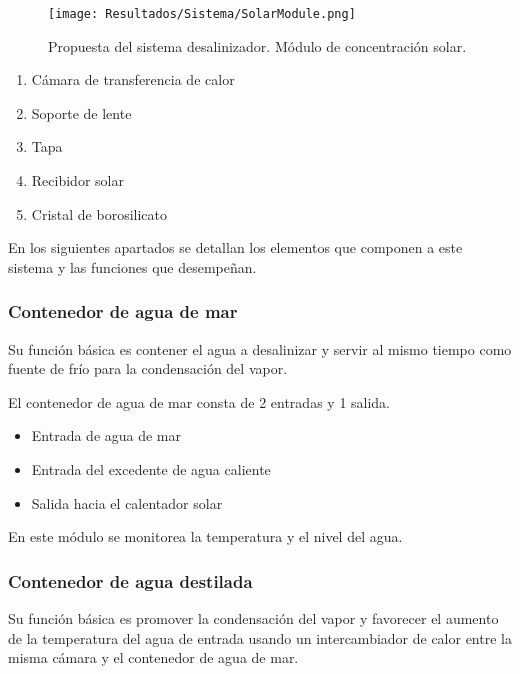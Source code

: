 			\begin{figure}[H]
				\centering
				\texttt{[image: Resultados/Sistema/SolarModule.png]}
				\caption{Propuesta del sistema desalinizador. Módulo de concentración solar.}
				\label{fig:SolarModule}
			\end{figure}
			
			\begin{enumerate}[columns=2]
				\item Cámara de transferencia de calor
				\item Soporte de lente
				\item Tapa
				\item Recibidor solar
				\item Cristal de borosilicato
			\end{enumerate}
			
			En los siguientes apartados se detallan los elementos que componen a este sistema y las funciones que desempeñan.
	
			\subsubsection{Contenedor de agua de mar}
				
				Su función básica es contener el agua a desalinizar y servir al mismo tiempo como fuente de frío para la condensación del vapor.
				
				El contenedor de agua de mar consta de 2 entradas y 1 salida.
				\begin{itemize}[columns=2]
					\item Entrada de agua de mar
					\item Entrada del excedente de agua caliente
					\item Salida hacia el calentador solar
				\end{itemize}
				
				\begin{center}
					En este módulo se monitorea la temperatura y el nivel del agua.
				\end{center}			
			
			\subsubsection{Contenedor de agua destilada}
				
				Su función básica es promover la condensación del vapor y favorecer el aumento de la temperatura del agua de entrada usando un intercambiador de calor entre la misma cámara y el contenedor de agua de mar.
				
